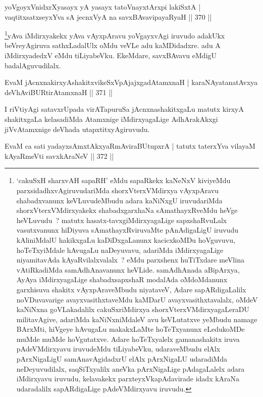 \begin{shl}
yoVgoyxVnidxrXyasayx yA yasayx tatoV\s nayxtArxpi lakiSxtA |
vaqtitxsatxseyxYva sA jecnxVyA na savxBAvavipayaRyaH \hfill || 370 ||
\end{shl}

\begin{artha}
\footnote[1]{`cakuSxH sharxvAH sapaRH' eMdu sapaRkekx kaNeNxV kiviyeMdu parxsidadhxvAgiruvudariMda shorxVterxVMdirxya vAyxpAravu shabadxvanunx keVLuvudeMbudu adara kaNiNxgU iruvudariMda shorxVterxVMdirxyakekx shabadxgarxhaNa sAmathayxRveMdu heVge heVLuvudu~? matutx hasatx-tavxgiMdirxyagaLige sapxshaRvuLalx vasutxvanunx hiDiyuva sAmathayxRviruvaMte pAnAdigaLigU iruvudu kAliniMdalU hakikxgaLu kaDiDxgaLanunx kacicxkoMDu hoVguvuvu, hoTeTxyiMdale hAvugaLu naDeyuvavu, adariMda iMdirxyagaLige niyamitavAda kAyaRvilalxvalalx~? eMdu parxshenx huTiTxdare meVlina vAtiRkadiMda samAdhAnavanunx heVLide. samAdhAnada aBipArxya, AyAya iMdirxyagaLige shabadxsapxshaR modalAda oMdoMdanunx garxhisuva shakitx vAyxpAraveMbudu niyataveV, Adare sapARdigaLalilx noVDuvavarige avayxvasithxtaveMdu kaMDarU avayxvasithxtavalalx, oMdeV kaNiNxna goVLakadalilx cakuSxriMdirxya shorxVterxVMdirxyagaLeraDU militavAgive, adariMda kaNiNxniMdaleV avu keVLutatxve yeMbudu namage BArxMti, hiVgeye hAvugaLu makakxLaMte hoTeTxyanunx eLedukoMDe muMde muMde hoVgutatxve. Adare hoTeTxyalelx gamanashakitx iruva pAdeVMdirxyavu iruvudeMdu tiLiyabeVku, udaraveMbudu elAlx pArxNigaLigU samAnavAgidadxrU elAlx pArxNigaLU udaradiMda neDeyuvudilalx, saqSiTxyalilx aneVka pArxNigaLige pAdagaLalelx adara iMdirxyavu iruvudu, kelavakekx parxteyxVkapAdavirade idadx kAraNa udaradalilx sapARdigaLige pAdeVMdirxyavu iruvudu.}yAva iMdirxyakekx yAva vAyxpAravu yoVgayxvAgi iruvudo adakUkx beVreyAgiruva sathxLadalUlx oMdu veVLe adu kaMDidadxre. adu A iMdirxyadedxV eMdu tiLiyabeVku. EkeMdare, savxBAvavu eMdigU badalAguvudilalx.
\end{artha}

\begin{shl}
EvaM jAcnxnakirxyAshakitxvikeSxVpAjajxgadAtamxnaH |
karaNAyatanatAvxya deVhAviBURtirAtamxnaH \hfill || 371 ||
\end{shl}

\begin{artha}
I riVtiyAgi satavxrUpada virATapuruSa jAcnxnashakitxgaLu matutx kirxyA shakitxgaLa kelasadiMda Atamxnige iMdirxyagaLige AdhArakAkxgi jiVvAtamxnige deVhada utapxtitxyAgiruvudu.
\end{artha}

\begin{shl}
EvaM ca sati yadayxsAmxtAkxyaRmAviraBUtupxrA |
tatutx taterxYva vilayaM kAyaRmeVti savxkAraNeV \hfill || 372 ||
\end{shl}

